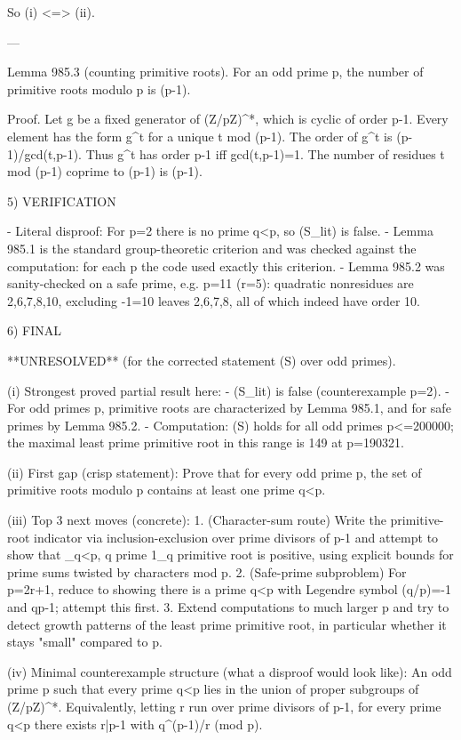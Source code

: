 So (i) <=> (ii).

---

Lemma 985.3 (counting primitive roots).
For an odd prime p, the number of primitive roots modulo p is \varphi(p-1).

Proof.
Let g be a fixed generator of (Z/pZ)^*, which is cyclic of order p-1. Every element has the
form g^t for a unique t mod (p-1). The order of g^t is (p-1)/gcd(t,p-1). Thus g^t has order
p-1 iff gcd(t,p-1)=1. The number of residues t mod (p-1) coprime to (p-1) is \varphi(p-1).

5) VERIFICATION

- Literal disproof: For p=2 there is no prime q<p, so (S_lit) is false.
- Lemma 985.1 is the standard group-theoretic criterion and was checked against the
  computation: for each p the code used exactly this criterion.
- Lemma 985.2 was sanity-checked on a safe prime, e.g. p=11 (r=5): quadratic nonresidues
  are {2,6,7,8,10}, excluding -1=10 leaves {2,6,7,8}, all of which indeed have order 10.

6) FINAL

**UNRESOLVED** (for the corrected statement (S) over odd primes).

(i) Strongest proved partial result here:
    - (S_lit) is false (counterexample p=2).
    - For odd primes p, primitive roots are characterized by Lemma 985.1, and for safe primes
      by Lemma 985.2.
    - Computation: (S) holds for all odd primes p<=200000; the maximal least prime primitive
      root in this range is 149 at p=190321.

(ii) First gap (crisp statement):
    Prove that for every odd prime p, the set of primitive roots modulo p contains at least
    one prime q<p.

(iii) Top 3 next moves (concrete):
    1. (Character-sum route) Write the primitive-root indicator via inclusion-exclusion over
       prime divisors of p-1 and attempt to show that \sum_{q<p, q prime} 1_{q primitive root}
       is positive, using explicit bounds for prime sums twisted by characters mod p.
    2. (Safe-prime subproblem) For p=2r+1, reduce to showing there is a prime q<p with
       Legendre symbol (q/p)=-1 and q\ne p-1; attempt this first.
    3. Extend computations to much larger p and try to detect growth patterns of the least
       prime primitive root, in particular whether it stays "small" compared to p.

(iv) Minimal counterexample structure (what a disproof would look like):
    An odd prime p such that every prime q<p lies in the union of proper subgroups of
    (Z/pZ)^*. Equivalently, letting r run over prime divisors of p-1,
      for every prime q<p there exists r|p-1 with q^{(p-1)/r}  (mod p).


